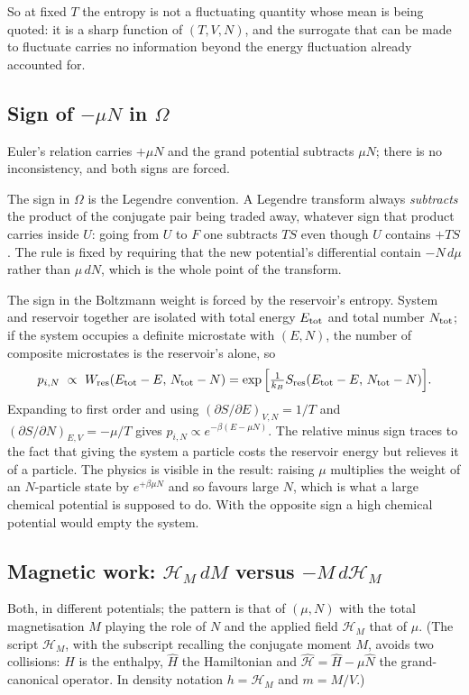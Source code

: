 \documentclass[10pt,a4paper]{article}
\theoremstyle{remark}
\newcommand{\hmag}{\mathcal{H}_M}
\begin{document}
So at fixed $T$ the entropy is not a fluctuating quantity whose mean is being
quoted: it is a sharp function of $(T,V,N)$, and the surrogate that can be made
to fluctuate carries no information beyond the energy fluctuation already
accounted for.


\subsection*{Sign of $-\mu N$ in $\Omega$}
Euler's relation carries $+\mu N$ and the grand potential subtracts $\mu N$;
there is no inconsistency, and both signs are forced.

The sign in $\Omega$ is the Legendre convention. A Legendre transform always
\emph{subtracts} the product of the conjugate pair being traded away, whatever
sign that product carries inside $U$: going from $U$ to $F$ one subtracts $TS$
even though $U$ contains $+TS$. The rule is fixed by requiring that the new
potential's differential contain $-N\,d\mu$ rather than $\mu\,dN$, which is the
whole point of the transform.

The sign in the Boltzmann weight is forced by the reservoir's entropy. System and
reservoir together are isolated with total energy $E_{\rm tot}$ and total number
$N_{\rm tot}$; if the system occupies a definite microstate with $(E,N)$, the
number of composite microstates is the reservoir's alone, so
\[
p_{i,N}\ \propto\ W_{\rm res}(E_{\rm tot}-E,\,N_{\rm tot}-N)
=\exp\Big[\tfrac{1}{k_B}S_{\rm res}(E_{\rm tot}-E,\,N_{\rm tot}-N)\Big].
\]
Expanding to first order and using $(\partial S/\partial E)_{V,N}=1/T$ and
$(\partial S/\partial N)_{E,V}=-\mu/T$ gives
$p_{i,N}\propto e^{-\beta(E-\mu N)}$. The relative minus sign traces to the fact
that giving the system a particle costs the reservoir energy but relieves it of a
particle. The physics is visible in the result: raising $\mu$ multiplies the
weight of an $N$-particle state by $e^{+\beta\mu N}$ and so favours large $N$,
which is what a large chemical potential is supposed to do. With the opposite
sign a high chemical potential would empty the system.


\subsection*{Magnetic work: $\hmag{}\,dM$ versus $-M\,d\hmag{}$}
Both, in different potentials; the pattern is that of $(\mu,N)$ with the total
magnetisation $M$ playing the role of $N$ and the applied field $\hmag{}$
that of $\mu$. (The script $\hmag{}$, with the subscript recalling the conjugate
moment $M$, avoids two collisions: $H$ is the enthalpy, $\hat H$ the
Hamiltonian and $\hat{\mathcal{H}}=\hat H-\mu\hat N$ the grand-canonical
operator. In density notation $h=\hmag{}$ and $m=M/V$.)
\end{document}
